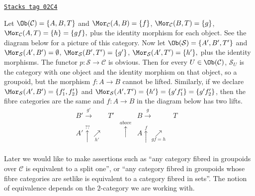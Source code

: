\begin{example}
\label{categories-example-not-fibred-in-groupoids-but-fibre-cats-are}
\href{https://stacks.math.columbia.edu/tag/02C4}{\texttt{Stacks tag 02C4}}

Let $\Ob(\mathcal{C}) = \{A, B, T\}$ and
$\Mor_\mathcal{C}(A, B) = \{f\}$, $\Mor_\mathcal{C}(B, T) = \{g\}$,
$\Mor_\mathcal{C}(A, T) = \{h\} = \{gf\}, $ plus the identity morphism
for each object. See the diagram below for a picture of this category. Now let
$\Ob(\mathcal{S}) = \{A', B', T'\}$ and
$\Mor_\mathcal{S}(A', B') = \emptyset$,
$\Mor_\mathcal{S}(B', T') = \{g'\}$,
$\Mor_\mathcal{S}(A', T') = \{h'\}, $ plus the identity morphisms. The
functor $p : \mathcal{S} \to \mathcal{C}$ is obvious. Then for every
$U \in \Ob(\mathcal{C})$, $\mathcal{S}_U$ is the category with one
object and the identity morphism on that object, so a groupoid, but the
morphism $f: A \to B$ cannot be lifted. Similarly, if we declare
$\Mor_\mathcal{S}(A', B') = \{f'_1, f'_2\}$ and
$ \Mor_\mathcal{S}(A', T') = \{h'\} = \{g'f'_1 \} = \{g'f'_2\}$, then
the fibre categories are the same and $f: A \to B$ in the diagram below has
two lifts.
$$
\begin{array}{cccccc}B' \overset{g'}{\longrightarrow} & T' &  & B \overset{g}{\longrightarrow} & T &  \\ A' \overset{??}{\uparrow}\underset{h'}{\nearrow} &  & \overset{above}{\uparrow} & A \overset{f}{\uparrow}\underset{gf = h}{\nearrow} &  &  \\  &  &  &  &  & \end{array}
$$
\end{example}

Later we would like to make assertions such as ``any category fibred in
groupoids over $\mathcal{C}$ is equivalent to a split one'', or
``any category fibred in groupoids whose fibre categories are setlike
is equivalent to a category fibred in sets''. The notion of equivalence
depends on the $2$-category we are working with.

